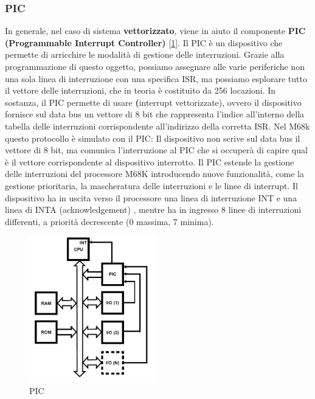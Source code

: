 \subsubsection{PIC} \label{par:PIC}
In generale, nel caso di sistema \textbf{vettorizzato}, viene in aiuto il componente \textbf{PIC (Programmable Interrupt Controller)} [\ref{img:PIC}].
Il PIC è un dispositivo che permette di arricchire le
modalità di gestione delle interruzioni. Grazie alla programmazione di questo oggetto, possiamo assegnare alle varie periferiche non una sola linea di interruzione con una specifica ISR, ma possiamo esplorare tutto il vettore delle interruzioni, che in teoria è costituito da 256 locazioni. In sostanza, il PIC permette di usare \textbf(interrupt vettorizzate), ovvero il dispositivo fornisce sul data bus un vettore di 8 bit che rappresenta l’indice all’interno della tabella delle interruzioni corrispondente all’indirizzo della corretta ISR. Nel M68k questo protocollo è simulato con il PIC: Il dispositivo non scrive sul data bus il vettore di 8 bit, ma comunica l’interruzione al PIC che si occuperà di capire qual è il vettore corrispondente al dispositivo interrotto. Il PIC estende la gestione delle interruzioni del processore M68K introducendo nuove funzionalità, come la gestione prioritaria, la mascheratura delle interruzioni e le linee di interrupt. Il dispositivo ha in uscita verso il processore una linea di interruzione INT e una linea di INTA (acknowledgement) , mentre ha in ingresso 8 linee di interruzioni differenti, a priorità decrescente (0 massima, 7 minima).

\begin{figure} [h!]
    \centering
    \includegraphics[width=0.5\textwidth]{img/PIC3.png}
    \caption{PIC}\label{img:PIC}
\end{figure}


